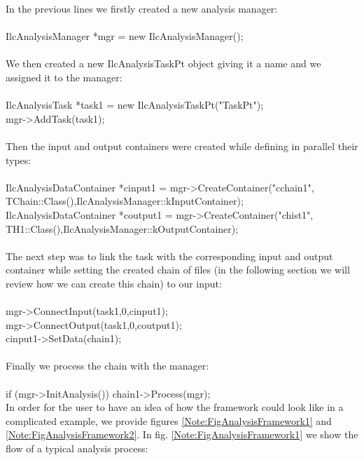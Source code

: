 \vspace{0.2 cm}
In the previous lines we firstly created a new analysis manager:\\
\\
{\ttfamily IlcAnalysisManager *mgr = new IlcAnalysisManager();}\\
\\
We then created a new {\ttfamily IlcAnalysisTaskPt} object giving it a name and we assigned it to the manager:\\
\\
{\ttfamily IlcAnalysisTask *task1 = new IlcAnalysisTaskPt("TaskPt");}\\
{\ttfamily mgr->AddTask(task1);}\\
\\
Then the input and output containers were created while defining in parallel their types: \\
\\
{\ttfamily IlcAnalysisDataContainer *cinput1 = mgr->CreateContainer("cchain1", TChain::Class(),IlcAnalysisManager::kInputContainer);}\\
{\ttfamily IlcAnalysisDataContainer *coutput1 = mgr->CreateContainer("chist1", TH1::Class(),IlcAnalysisManager::kOutputContainer);}\\
\\
The next step was to link the task with the corresponding input and output container while setting the created chain of files (in the following section we will review how we can create this chain) to our input:\\
\\
{\ttfamily mgr->ConnectInput(task1,0,cinput1);}\\
{\ttfamily mgr->ConnectOutput(task1,0,coutput1);}\\
{\ttfamily cinput1->SetData(chain1);}\\
\\
Finally we process the chain with the manager:\\
\\
{\ttfamily   if (mgr->InitAnalysis()) chain1->Process(mgr);}\\

\vspace{0.5 cm}
In order for the user to have an idea of how the framework could look like in a complicated example, we provide figures \ref{Note:FigAnalysisFramework1} and \ref{Note:FigAnalysisFramework2}. In fig. \ref{Note:FigAnalysisFramework1} we show the flow of a typical analysis process:


